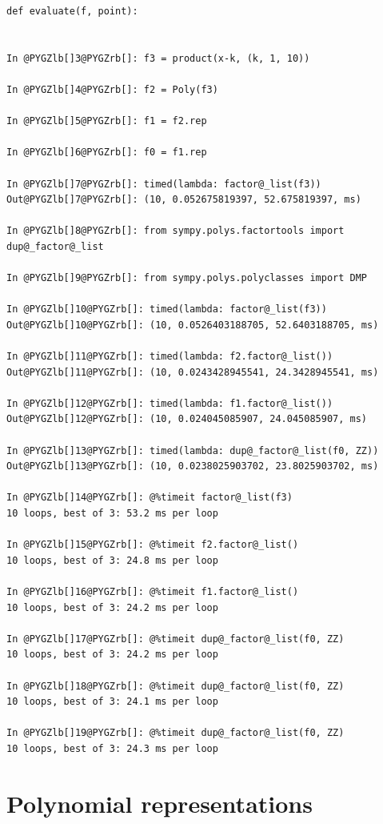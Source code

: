 \begin{Verbatim}[commandchars=@\[\]]
def evaluate(f, point):


In @PYGZlb[]3@PYGZrb[]: f3 = product(x-k, (k, 1, 10))

In @PYGZlb[]4@PYGZrb[]: f2 = Poly(f3)

In @PYGZlb[]5@PYGZrb[]: f1 = f2.rep

In @PYGZlb[]6@PYGZrb[]: f0 = f1.rep

In @PYGZlb[]7@PYGZrb[]: timed(lambda: factor@_list(f3))
Out@PYGZlb[]7@PYGZrb[]: (10, 0.052675819397, 52.675819397, ms)

In @PYGZlb[]8@PYGZrb[]: from sympy.polys.factortools import dup@_factor@_list

In @PYGZlb[]9@PYGZrb[]: from sympy.polys.polyclasses import DMP

In @PYGZlb[]10@PYGZrb[]: timed(lambda: factor@_list(f3))
Out@PYGZlb[]10@PYGZrb[]: (10, 0.0526403188705, 52.6403188705, ms)

In @PYGZlb[]11@PYGZrb[]: timed(lambda: f2.factor@_list())
Out@PYGZlb[]11@PYGZrb[]: (10, 0.0243428945541, 24.3428945541, ms)

In @PYGZlb[]12@PYGZrb[]: timed(lambda: f1.factor@_list())
Out@PYGZlb[]12@PYGZrb[]: (10, 0.024045085907, 24.045085907, ms)

In @PYGZlb[]13@PYGZrb[]: timed(lambda: dup@_factor@_list(f0, ZZ))
Out@PYGZlb[]13@PYGZrb[]: (10, 0.0238025903702, 23.8025903702, ms)

In @PYGZlb[]14@PYGZrb[]: @%timeit factor@_list(f3)
10 loops, best of 3: 53.2 ms per loop

In @PYGZlb[]15@PYGZrb[]: @%timeit f2.factor@_list()
10 loops, best of 3: 24.8 ms per loop

In @PYGZlb[]16@PYGZrb[]: @%timeit f1.factor@_list()
10 loops, best of 3: 24.2 ms per loop

In @PYGZlb[]17@PYGZrb[]: @%timeit dup@_factor@_list(f0, ZZ)
10 loops, best of 3: 24.2 ms per loop

In @PYGZlb[]18@PYGZrb[]: @%timeit dup@_factor@_list(f0, ZZ)
10 loops, best of 3: 24.1 ms per loop

In @PYGZlb[]19@PYGZrb[]: @%timeit dup@_factor@_list(f0, ZZ)
10 loops, best of 3: 24.3 ms per loop
\end{Verbatim}
\noindent

\section{Polynomial representations}

